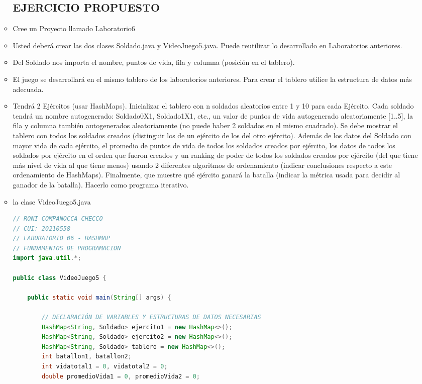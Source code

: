 \documentclass{article}
\begin{document}
\begin{itemize}
\begin{itemize}
        \subsection{EJERCICIO PROPUESTO}
        \item Cree un Proyecto llamado Laboratorio6
        \item Usted deberá crear las dos clases Soldado.java y VideoJuego5.java. Puede reutilizar lo desarrollado en Laboratorios anteriores.
        \item Del Soldado nos importa el nombre, puntos de vida, fila y columna (posición en el tablero).
        \item El juego se desarrollará en el mismo tablero de los laboratorios anteriores. Para crear el tablero utilice la estructura de datos más adecuada.
        \item Tendrá 2 Ejércitos (usar HashMaps). Inicializar el tablero con n soldados aleatorios entre 1 y 10 para cada Ejército. Cada soldado tendrá un nombre autogenerado: Soldado0X1, Soldado1X1, etc., un valor de puntos de vida autogenerado aleatoriamente [1..5], la fila y columna también autogenerados aleatoriamente (no puede haber 2 soldados en el mismo cuadrado). Se debe mostrar el tablero con todos los soldados creados (distinguir los de un ejército de los del otro ejército). Además de los datos del Soldado con mayor vida de cada ejército, el promedio de puntos de vida de todos los soldados creados por ejército, los datos de todos los soldados por ejército en el orden que fueron creados y un ranking de poder de todos los soldados creados por ejército (del que tiene más nivel de vida al que tiene menos) usando 2 diferentes algoritmos de ordenamiento (indicar conclusiones respecto a este ordenamiento de HashMaps). Finalmente, que muestre qué ejército ganará la batalla (indicar la métrica usada para decidir al ganador de la batalla). Hacerlo como programa iterativo.
        
        \item la clase VideoJuego5.java        
        \begin{lstlisting}[language=java]
// RONI COMPANOCCA CHECCO
// CUI: 20210558
// LABORATORIO 06 - HASHMAP
// FUNDAMENTOS DE PROGRAMACION 
import java.util.*;

public class VideoJuego5 {

    public static void main(String[] args) {

        // DECLARACIÓN DE VARIABLES Y ESTRUCTURAS DE DATOS NECESARIAS
        HashMap<String, Soldado> ejercito1 = new HashMap<>();
        HashMap<String, Soldado> ejercito2 = new HashMap<>();
        HashMap<String, Soldado> tablero = new HashMap<>();
        int batallon1, batallon2;
        int vidatotal1 = 0, vidatotal2 = 0;
        double promedioVida1 = 0, promedioVida2 = 0;


\end{lstlisting}
\end{itemize}
\end{itemize}
\end{document}
